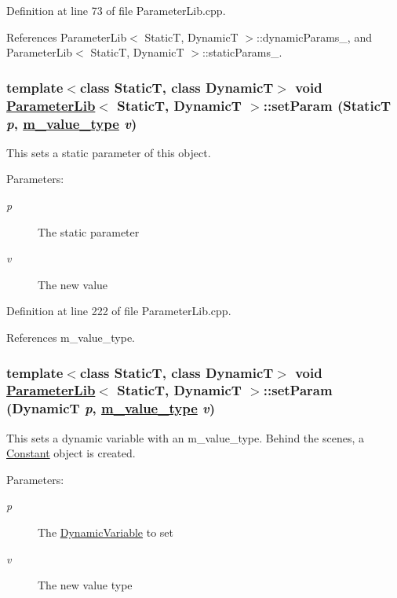 Definition at line 73 of file Parameter\-Lib.cpp.

References Parameter\-Lib$<$ Static\-T, Dynamic\-T $>$::dynamic\-Params\_\-, and Parameter\-Lib$<$ Static\-T, Dynamic\-T $>$::static\-Params\_\-.\hypertarget{classParameterLib_a7}{
\subsubsection[setParam]{\setlength{\rightskip}{0pt plus 5cm}template$<$class Static\-T, class Dynamic\-T$>$ void \hyperlink{classParameterLib}{Parameter\-Lib}$<$ Static\-T, Dynamic\-T $>$::set\-Param (Static\-T {\em p}, \hyperlink{Types_8h_a3}{m\_\-value\_\-type} {\em v})}}
\label{classParameterLib_a7}


This sets a static parameter of this object. \begin{Desc}
\item[Parameters:]
\begin{description}
\item[{\em p}]The static parameter \item[{\em v}]The new value \end{description}
\end{Desc}


Definition at line 222 of file Parameter\-Lib.cpp.

References m\_\-value\_\-type.\hypertarget{classParameterLib_a5}{
\subsubsection[setParam]{\setlength{\rightskip}{0pt plus 5cm}template$<$class Static\-T, class Dynamic\-T$>$ void \hyperlink{classParameterLib}{Parameter\-Lib}$<$ Static\-T, Dynamic\-T $>$::set\-Param (Dynamic\-T {\em p}, \hyperlink{Types_8h_a3}{m\_\-value\_\-type} {\em v})}}
\label{classParameterLib_a5}


This sets a dynamic variable with an m\_\-value\_\-type. Behind the scenes, a \hyperlink{classConstant}{Constant} object is created. \begin{Desc}
\item[Parameters:]
\begin{description}
\item[{\em p}]The \hyperlink{classDynamicVariable}{Dynamic\-Variable} to set \item[{\em v}]The new value type \end{description}
\end{Desc}


